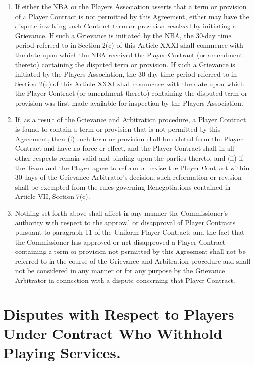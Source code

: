 \documentclass[
]{book}
\providecommand{\tightlist}{%
  \setlength{\itemsep}{0pt}\setlength{\parskip}{0pt}}
\begin{document}
\begin{enumerate}
\def\labelenumi{(\alph{enumi})}
\tightlist
\item
  If either the NBA or the Players Association asserts that a term or provision of a Player Contract is not permitted by this Agreement, either may have the dispute involving such Contract term or provision resolved by initiating a Grievance. If such a Grievance is initiated by the NBA, the 30-day time period referred to in Section 2(c) of this Article XXXI shall commence with the date upon which the NBA received the Player Contract (or amendment thereto) containing the disputed term or provision. If such a Grievance is initiated by the Players Association, the 30-day time period referred to in Section 2(c) of this Article XXXI shall commence with the date upon which the Player Contract (or amendment thereto) containing the disputed term or provision was first made available for inspection by the Players Association.
\item
  If, as a result of the Grievance and Arbitration procedure, a Player Contract is found to contain a term or provision that is not permitted by this Agreement, then (i) such term or provision shall be deleted from the Player Contract and have no force or effect, and the Player Contract shall in all other respects remain valid and binding upon the parties thereto, and (ii) if the Team and the Player agree to reform or revise the Player Contract within 30 days of the Grievance Arbitrator's decision, such reformation or revision shall be exempted from the rules governing Renegotiations contained in Article VII, Section 7(c).
\item
  Nothing set forth above shall affect in any manner the Commissioner's authority with respect to the approval or disapproval of Player Contracts pursuant to paragraph 11 of the Uniform Player Contract; and the fact that the Commissioner has approved or not disapproved a Player Contract containing a term or provision not permitted by this Agreement shall not be referred to in the course of the Grievance and Arbitration procedure and shall not be considered in any manner or for any purpose by the Grievance Arbitrator in connection with a dispute concerning that Player Contract.
\end{enumerate}

\hypertarget{disputes-with-respect-to-players-under-contract-who-withhold-playing-services.}{%
\section{Disputes with Respect to Players Under Contract Who Withhold Playing Services.}\label{disputes-with-respect-to-players-under-contract-who-withhold-playing-services.}}
\end{document}
